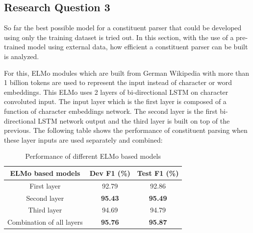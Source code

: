 \documentclass[a4paper, 11pt]{article}
\begin{document}
\pagebreak
\subsection{Research Question 3}
So far the best possible model for a constituent parser that could be developed using only the training dataset is tried out. In this section, with the use of a pre-trained model using external data, how efficient a constituent parser can be built is analyzed.

For this, ELMo modules which are built from German Wikipedia with more than 1 billion tokens are used to represent the input instead of character or word embeddings. This ELMo uses 2 layers of bi-directional LSTM on character convoluted input. The input layer which is the first layer is composed of a function of character embeddings network. The second layer is the first bi-directional LSTM network output and the third layer is built on top of the previous. The following table shows the performance of constituent parsing when these layer inputs are used separately and combined:

\begin{table}[h!]
  \begin{center}
    \label{tab:different-elmo-models}
    \def\arraystretch{1.5}%
    \begin{tabular}{c|c|c}
      ELMo based models & Dev F1 (\%) & Test F1 (\%) \\
      \hline
	  First layer & 92.79 & 92.86\\
      Second layer  & \textbf{95.43} & \textbf{95.49}\\
      Third layer & 94.69 & 94.79\\
      Combination of all layers & \textbf{95.76} & \textbf{95.87}\\     
    \end{tabular}
    \caption{Performance of different ELMo based models}
  \end{center}
\end{table}
\end{document}
